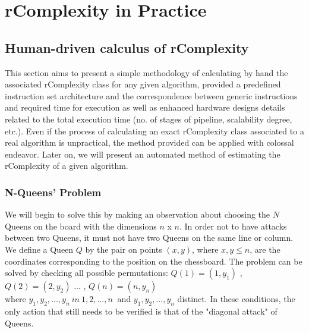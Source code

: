 \chapter{rComplexity in Practice}

\section{Human-driven calculus of rComplexity}
This section aims to present a simple methodology of calculating by hand the associated rComplexity class for any given algorithm, provided a predefined instruction set architecture and the correspondence between generic instructions and required time for execution as well as enhanced hardware designs details related to the total execution time (no. of stages of pipeline, scalability degree, etc.). Even if the process of calculating an exact rComplexity class associated to a real algorithm is unpractical, the method provided can be applied with colossal endeavor. Later on, we will present an automated method of estimating the rComplexity of a given algorithm.

\subsection{N-Queens’ Problem}
We will begin to solve this by making an observation about choosing the $N$ Queens on the board with the dimensions $n$ x $n$. In order not to have attacks between two Queens, it must not have two Queens on the same line or column. We define a Queen $Q$ by the pair on points $ (x, y) $, where $ x, y \leq n $, are the coordinates corresponding to the position on the chessboard.
The problem can be solved by checking all possible permutations: $ Q (1) = (1, y_1) $ , 
$ Q (2) = (2, y_2) $ ... , $ Q (n) = (n, y_n) $ \\
where $ y_1, y_2, ..., y_n \ in \ { 1,2, ..., n \ } $ and $ y_1, y_2, ..., y_n $ distinct. In these conditions, the only action that still needs to be verified is that of the "diagonal attack" of Queens.

